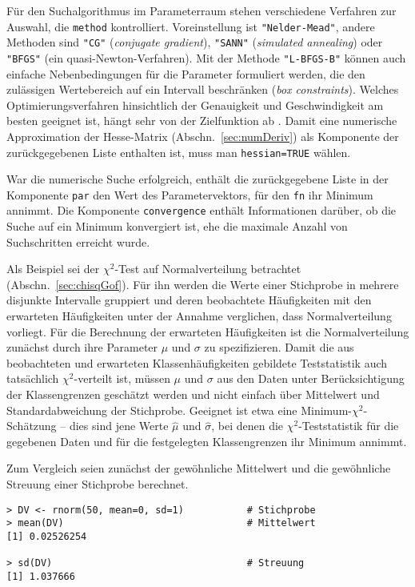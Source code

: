 Für den Suchalgorithmus im Parameterraum stehen verschiedene Verfahren zur Auswahl, die \lstinline!method! kontrolliert. Voreinstellung ist \lstinline!"Nelder-Mead"!, andere Methoden sind \lstinline!"CG"! (\emph{conjugate gradient}), \lstinline!"SANN"! (\emph{simulated annealing}) oder \lstinline!"BFGS"! (ein quasi-Newton-Verfahren). Mit der Methode \lstinline!"L-BFGS-B"! können auch einfache Nebenbedingungen für die Parameter formuliert werden, die den zulässigen Wertebereich auf ein Intervall beschränken (\emph{box constraints}). Welches Optimierungsverfahren hinsichtlich der Genauigkeit und Geschwindigkeit am besten geeignet ist, hängt sehr von der Zielfunktion ab \cite{Nash2014a,Nash2014b}. Damit eine numerische Approximation der Hesse-Matrix (Abschn.\ \ref{sec:numDeriv}) als Komponente der zurückgegebenen Liste enthalten ist, muss man \lstinline!hessian=TRUE! wählen.

War die numerische Suche erfolgreich, enthält die zurückgegebene Liste in der Komponente \lstinline!par! den Wert des Parametervektors, für den \lstinline!fn! ihr Minimum annimmt. Die Komponente \lstinline!convergence! enthält Informationen darüber, ob die Suche auf ein Minimum konvergiert ist, ehe die maximale Anzahl von Suchschritten erreicht wurde.

Als Beispiel sei der $\chi^{2}$-Test auf Normalverteilung betrachtet (Abschn.\ \ref{sec:chisqGof}). Für ihn werden die Werte einer Stichprobe in mehrere disjunkte Intervalle gruppiert und deren beobachtete Häufigkeiten mit den erwarteten Häufigkeiten unter der Annahme verglichen, dass Normalverteilung vorliegt. Für die Berechnung der erwarteten Häufigkeiten ist die Normalverteilung zunächst durch ihre Parameter $\mu$ und $\sigma$ zu spezifizieren. Damit die aus beobachteten und erwarteten Klassenhäufigkeiten gebildete Teststatistik auch tatsächlich $\chi^{2}$-verteilt ist, müssen $\mu$ und $\sigma$ aus den Daten unter Berücksichtigung der Klassengrenzen geschätzt werden und nicht einfach über Mittelwert und Standardabweichung der Stichprobe. Geeignet ist etwa eine Minimum-$\chi^{2}$-Schätzung -- dies sind jene Werte $\hat{\mu}$ und $\hat{\sigma}$, bei denen die $\chi^{2}$-Teststatistik für die gegebenen Daten und für die festgelegten Klassengrenzen ihr Minimum annimmt.

Zum Vergleich seien zunächst der gewöhnliche Mittelwert und die gewöhnliche Streuung einer Stichprobe berechnet.
\begin{lstlisting}
> DV <- rnorm(50, mean=0, sd=1)           # Stichprobe
> mean(DV)                                # Mittelwert
[1] 0.02526254

> sd(DV)                                  # Streuung
[1] 1.037666
\end{lstlisting}

